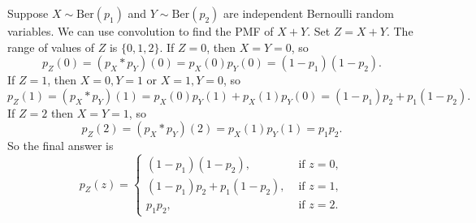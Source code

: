 \documentclass{ximera}
\begin{document}
\begin{example}
Suppose $X\sim \text{Ber}(p_1)$ and $Y\sim \text{Ber}(p_2)$ are independent Bernoulli random variables. We can use convolution to find the PMF of $X+Y$. Set $Z=X+Y$. The range of values of $Z$ is $\{0,1,2\}$.  If $Z=0$, then $X=Y=0$, so
$$
p_Z(0) = (p_X * p_Y)(0) = p_X(0)p_Y(0) = (1-p_1)(1-p_2).
$$
If $Z=1$, then $X=0,Y=1$ or $X=1,Y=0$, so 
$$
p_Z(1) = (p_X * p_Y)(1) = p_X(0)p_Y(1) + p_X(1)p_Y(0) = (1-p_1)p_2 + p_1(1-p_2). 
$$
If $Z=2$ then $X=Y=1$, so 
$$
p_Z(2) = (p_X * p_Y)(2) = p_X(1)p_Y(1) = p_1p_2.
$$
So the final answer is
$$
p_Z(z) = 
\begin{cases}
(1-p_1)(1-p_2), & \text{ if } z=0, \\
(1-p_1)p_2+p_1(1-p_2), & \text{ if } z=1, \\
p_1p_2, & \text{ if } z=2.
\end{cases}
$$

\end{example}
\end{document}
